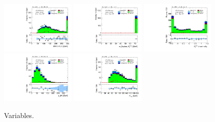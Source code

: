 \begin{figure}[tp]
  \includegraphics[width=0.32\textwidth]{figures/analysis/vbf-WlvCR/mMMC}
  \includegraphics[width=0.32\textwidth]{figures/analysis/vbf-WlvCR/mT}
  \includegraphics[width=0.32\textwidth]{figures/analysis/vbf-WlvCR/met-phi-centrality}
  \includegraphics[width=0.32\textwidth]{figures/analysis/vbf-WlvCR/H-pt-hi}
  \includegraphics[width=0.32\textwidth]{figures/analysis/vbf-WlvCR/mvis}
  \caption{Variables.}
  \label{fig:backgrounds-WlvCR-taus}
\end{figure}

